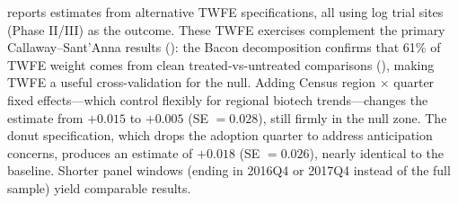 \documentclass[12pt]{article}
\begin{document}
 reports estimates from alternative TWFE specifications, all using log trial sites (Phase II/III) as the outcome. These TWFE exercises complement the primary Callaway--Sant'Anna results (): the Bacon decomposition confirms that 61\% of TWFE weight comes from clean treated-vs-untreated comparisons (), making TWFE a useful cross-validation for the null. Adding Census region $\times$ quarter fixed effects---which control flexibly for regional biotech trends---changes the estimate from $+0.015$ to $+0.005$ (SE $= 0.028$), still firmly in the null zone. The donut specification, which drops the adoption quarter to address anticipation concerns, produces an estimate of $+0.018$ (SE $= 0.026$), nearly identical to the baseline. Shorter panel windows (ending in 2016Q4 or 2017Q4 instead of the full sample) yield comparable results.
\end{document}
